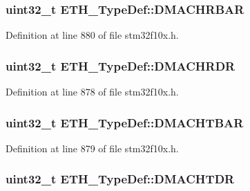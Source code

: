 \subsubsection[{\texorpdfstring{D\+M\+A\+C\+H\+R\+B\+AR}{DMACHRBAR}}]{ {\bf uint32\+\_\+t} E\+T\+H\+\_\+\+Type\+Def\+::\+D\+M\+A\+C\+H\+R\+B\+AR}\hypertarget{struct_e_t_h___type_def_a03160db5ffae457bab55c0358c4ef998}{}\label{struct_e_t_h___type_def_a03160db5ffae457bab55c0358c4ef998}


Definition at line 880 of file stm32f10x.\+h.

\subsubsection[{\texorpdfstring{D\+M\+A\+C\+H\+R\+DR}{DMACHRDR}}]{ {\bf uint32\+\_\+t} E\+T\+H\+\_\+\+Type\+Def\+::\+D\+M\+A\+C\+H\+R\+DR}\hypertarget{struct_e_t_h___type_def_ab4a222f725cc43952993519b20466637}{}\label{struct_e_t_h___type_def_ab4a222f725cc43952993519b20466637}


Definition at line 878 of file stm32f10x.\+h.

\subsubsection[{\texorpdfstring{D\+M\+A\+C\+H\+T\+B\+AR}{DMACHTBAR}}]{ {\bf uint32\+\_\+t} E\+T\+H\+\_\+\+Type\+Def\+::\+D\+M\+A\+C\+H\+T\+B\+AR}\hypertarget{struct_e_t_h___type_def_abb2eba5ee2a1621abeeb59e3aadc0318}{}\label{struct_e_t_h___type_def_abb2eba5ee2a1621abeeb59e3aadc0318}


Definition at line 879 of file stm32f10x.\+h.

\subsubsection[{\texorpdfstring{D\+M\+A\+C\+H\+T\+DR}{DMACHTDR}}]{ {\bf uint32\+\_\+t} E\+T\+H\+\_\+\+Type\+Def\+::\+D\+M\+A\+C\+H\+T\+DR}\hypertarget{struct_e_t_h___type_def_ab02310e389320a383022b666af621ba9}{}\label{struct_e_t_h___type_def_ab02310e389320a383022b666af621ba9}


